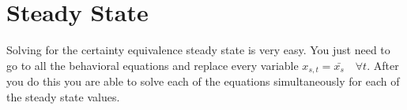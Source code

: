 \documentclass[paper=a4, fontsize=11pt]{scrartcl} %
\numberwithin{figure}{section} %
\numberwithin{table}{section} %
\begin{document}
\section{Steady State}

    Solving for the certainty equivalence steady state is very easy. You just need to go to all the behavioral equations and replace every variable $x_{s,t}=\bar{x_{s}} \quad \forall t$. After you do this you are able to solve each of the equations simultaneously for each of the steady state values.
\end{document}
